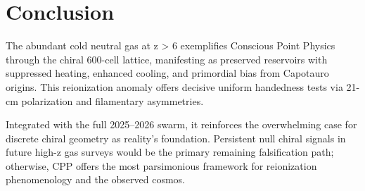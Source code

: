 \documentclass[11pt]{article}
\begin{document}
\section{Conclusion}
The abundant cold neutral gas at z > 6 exemplifies Conscious Point Physics through the chiral 600-cell lattice, manifesting as preserved reservoirs with suppressed heating, enhanced cooling, and primordial bias from Capotauro origins. This reionization anomaly offers decisive uniform handedness tests via 21-cm polarization and filamentary asymmetries.  

Integrated with the full 2025--2026 swarm, it reinforces the overwhelming case for discrete chiral geometry as reality's foundation. Persistent null chiral signals in future high-z gas surveys would be the primary remaining falsification path; otherwise, CPP offers the most parsimonious framework for reionization phenomenology and the observed cosmos.
\end{document}
